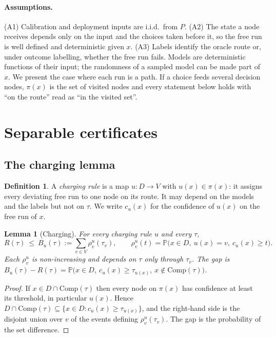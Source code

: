 \documentclass[11pt]{article}
\newtheorem{lemma}[theorem]{Lemma}
\theoremstyle{definition}
\newtheorem{definition}[theorem]{Definition}
\theoremstyle{remark}
\newcommand{\Prob}{\mathbb{P}}
\newcommand{\Comp}{\mathrm{Comp}}
\begin{document}
\paragraph{Assumptions.} (A1) Calibration and deployment inputs are i.i.d.\ from $P$. (A2) The
state a node receives depends only on the input and the choices taken before it, so the free
run is well defined and deterministic given $x$. (A3) Labels identify the oracle route or, under outcome labelling, whether the free run fails. Models are deterministic functions of their input; the
randomness of a sampled model can be made part of $x$. We
present the case where each run is a path. If a choice feeds several decision nodes, $\pi(x)$
is the set of visited nodes and every statement below holds with ``on the route'' read as ``in
the visited set''.

\section{Separable certificates}\label{sec:sep}

\subsection{The charging lemma}

\begin{definition}
A \emph{charging rule} is a map $u:D\to V$ with $u(x)\in\pi(x)$: it assigns every deviating
free run to one node on its route. It may depend on the models and the labels but not on
$\tau$. We write $c_u(x)$ for the confidence of $u(x)$ on the free run of $x$.
\end{definition}

\begin{lemma}[Charging]\label{lem:charging}
For every charging rule $u$ and every $\tau$,
\[
R(\tau)\ \le\ B_u(\tau):=\sum_{v\in V}\rho^u_v(\tau_v),\qquad
\rho^u_v(t)=\Prob\bigl(x\in D,\ u(x)=v,\ c_u(x)\ge t\bigr).
\]
Each $\rho^u_v$ is non-increasing and depends on $\tau$ only through $\tau_v$. The gap is
$B_u(\tau)-R(\tau)=\Prob\bigl(x\in D,\ c_u(x)\ge\tau_{u(x)},\ x\notin\Comp(\tau)\bigr)$.
\end{lemma}
\begin{proof}
If $x\in D\cap\Comp(\tau)$ then every node on $\pi(x)$ has confidence at least its threshold,
in particular $u(x)$. Hence $D\cap\Comp(\tau)\subseteq\{x\in D: c_u(x)\ge\tau_{u(x)}\}$, and the
right-hand side is the disjoint union over $v$ of the events defining $\rho^u_v(\tau_v)$. The
gap is the probability of the set difference.
\end{proof}
\end{document}
